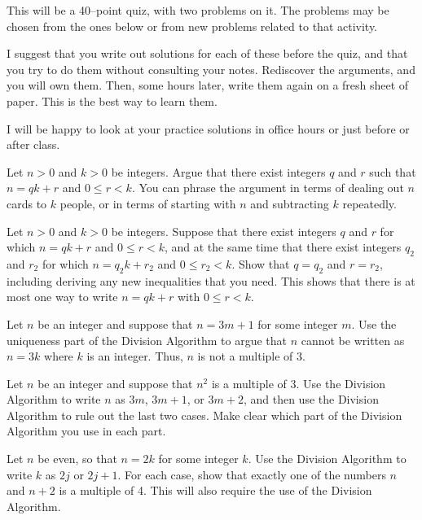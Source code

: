 
This will be a 40--point quiz, with two problems on it.
The problems may be chosen from the ones below or from new problems related to that activity.

I suggest that you write out solutions for each of these before the quiz, and that you try to do them without consulting your notes.
Rediscover the arguments, and you will own them.
Then, some hours later, write them again on a fresh sheet of paper.
This is the best way to learn them.

I will be happy to look at your practice solutions in office hours or just before or after class.

\blist{0.5in}
\item Let $n > 0$ and $k > 0$ be integers.
Argue that there exist integers $q$ and $r$ such that $n = qk + r$ and $0 \leq r < k$.
You can phrase the argument in terms of dealing out $n$ cards to $k$ people, or in terms of starting with $n$ and subtracting $k$ repeatedly.

\item Let $n > 0$ and $k > 0$ be integers.
Suppose that there exist integers $q$ and $r$ for which $n = qk + r$ and $0 \leq r < k$, and at the same time that there exist integers $q_2$ and $r_2$ for which $n = q_2 k + r_2$ and $0 \leq r_2 < k$.
Show that $q = q_2$ and $r = r_2$, including deriving any new inequalities that you need.
This shows that there is at most one way to write $n = qk + r$ with $0 \leq r < k$.

\item Let $n$ be an integer and suppose that $n = 3m+1$ for some integer $m$.
Use the uniqueness part of the Division Algorithm to argue that $n$ cannot be written as $n = 3k$ where $k$ is an integer.
Thus, $n$ is not a multiple of 3.

\item Let $n$ be an integer and suppose that $n^2$ is a multiple of 3.
Use the Division Algorithm to write $n$ as $3m$, $3m+1$, or $3m+2$, and then use the Division Algorithm to rule out the last two cases.
Make clear which part of the Division Algorithm you use in each part.

\item Let $n$ be even, so that $n = 2k$ for some integer $k$.
Use the Division Algorithm to write $k$ as $2j$ or $2j+1$.
For each case, show that exactly one of the numbers $n$ and $n+2$ is a multiple of 4.
This will also require the use of the Division Algorithm.

\elist
\vfill          %
